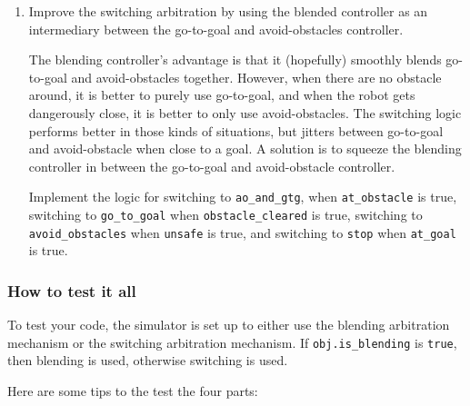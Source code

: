 \documentclass[10pt]{article}
\begin{document}
\begin{enumerate}
  \item Improve the switching arbitration by using the blended controller as an intermediary between the go-to-goal and avoid-obstacles controller.
  
  The blending controller's advantage is that it (hopefully) smoothly blends go-to-goal and avoid-obstacles together. However, when there are no obstacle around, it is better to purely use go-to-goal, and when the robot gets dangerously close, it is better to only use avoid-obstacles. The switching logic performs better in those kinds of situations, but jitters between go-to-goal and avoid-obstacle when close to a goal. A solution is to squeeze the blending controller in between the go-to-goal and avoid-obstacle controller.
  
  Implement the logic for switching to \texttt{ao\_and\_gtg}, when \texttt{at\_obstacle} is true, switching to \texttt{go\_to\_goal} when \texttt{obstacle\_cleared} is true, switching to \texttt{avoid\_obstacles} when \texttt{unsafe} is true, and switching to \texttt{stop} when \texttt{at\_goal} is true.
\end{enumerate}

\subsubsection*{How to test it all}

To test your code, the simulator is set up to either use the blending arbitration mechanism or the switching arbitration mechanism. If \texttt{obj.is\_blending} is \texttt{true}, then blending is used, otherwise switching is used. 

Here are some tips to the test the four parts:
\end{document}
